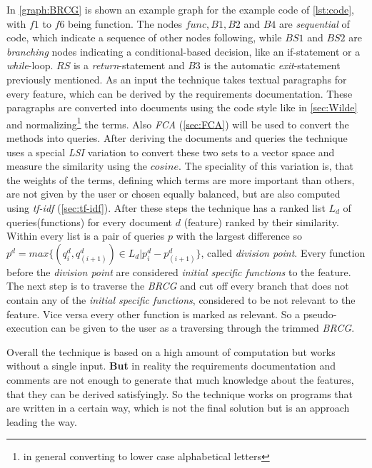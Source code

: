 In \autoref{graph:BRCG} is shown an example graph for the example code of \autoref{lst:code}, with $f1$ to $f6$ being function. The nodes $func, B1, B2$ and $B4$ are \textit{sequential} of code, which indicate a sequence of other nodes following, while $BS1$ and $BS2$ are \textit{branching} nodes indicating a conditional-based decision, like an if-statement or a \textit{while}-loop. $RS$ is a \textit{return}-statement and $B3$ is the automatic \textit{exit}-statement previously mentioned.\newline
As an input the technique takes textual paragraphs for every feature, which can be derived by the requirements documentation. These paragraphs are converted into documents using the code style  like in \autoref{sec:Wilde} and normalizing\footnote{in general converting to lower case alphabetical letters} the terms. Also \textit{FCA} (\autoref{sec:FCA}) will be used to convert the methods into queries. \newline
After deriving the documents and queries the technique uses a special \textit{LSI} variation to convert these two sets to a vector space and measure the similarity using the $cosine$. The speciality of this variation is, that the weights of the terms, defining which terms are more important than others, are not given by the user or chosen equally balanced, but are also computed using \textit{tf-idf} (\autoref{sec:tf-idf}).\newline
After these steps the technique has a ranked list $L_d$ of queries(functions) for every document $d$ (feature) ranked by their similarity. Within every list is a pair of queries $p$ with the largest difference so $p^d = max\{ (q^d_i, q^d_{(i+1)}) \in L_d | p^d_i - p^d_{(i+1)} \}$, called \textit{division point}. Every function before the \textit{division point} are considered \textit{initial specific functions} to the feature. \newline
The next step is to traverse the \textit{BRCG} and cut off every branch that does not contain any of the \textit{initial specific functions}, considered to be not relevant to the feature. Vice versa every other function is marked as relevant. So a pseudo-execution can be given to the user as a traversing through the trimmed \textit{BRCG}.\newline

Overall the technique is based on a high amount of computation but works without a single input. \textbf{But} in reality the requirements documentation and comments are not enough to generate that much knowledge about the features, that they can be derived satisfyingly. So the technique works on programs that are written in a certain way, which is not the final solution but is an approach leading the way.




